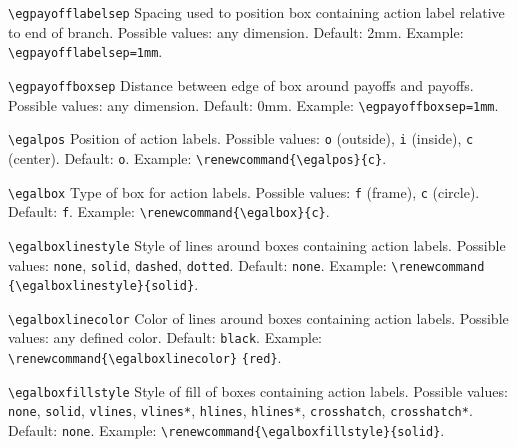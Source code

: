 \documentclass[12pt]{article}
\begin{document}
\vspace{4mm}

\sloppy
\noindent\verb+\egpayofflabelsep+\newline
\noindent Spacing used to position box containing action label relative to end
of branch.  Possible values: any dimension.  Default: 2mm.  Example:
\verb+\egpayofflabelsep=1mm+.

\fussy
\vspace{4mm}

\noindent\verb+\egpayoffboxsep+\newline
\noindent Distance between edge of box around payoffs and payoffs.  Possible
values: any dimension.  Default: 0mm.  Example: \verb+\egpayoffboxsep=1mm+.

\vspace{4mm}

\noindent\verb+\egalpos+\newline
\noindent Position of action labels.  Possible values: \verb+o+ (outside),
\verb+i+ (inside), \verb+c+ (center).  Default: \verb+o+.  Example:
\verb+\renewcommand{\egalpos}{c}+.

\vspace{4mm}

\noindent\verb+\egalbox+\newline
\noindent Type of box for action labels.  Possible values: \verb+f+ (frame),
\verb+c+ (circle).  Default: \verb+f+.  Example:
\verb+\renewcommand{\egalbox}{c}+.

\vspace{4mm}

\sloppy
\noindent\verb+\egalboxlinestyle+\newline
\noindent Style of lines around boxes containing action labels.  Possible
values: \verb+none+, \verb+solid+, \verb+dashed+, \verb+dotted+.  Default:
\verb+none+.  Example: \verb+\renewcommand+ \verb+{\egalboxlinestyle}{solid}+.

\fussy
\vspace{4mm}

\noindent\verb+\egalboxlinecolor+\newline
\noindent Color of lines around boxes containing action labels.  Possible
values: any defined color.  Default: \verb+black+.  Example:
\verb+\renewcommand{\egalboxlinecolor}+ \verb+{red}+.

\vspace{4mm}

\noindent\verb+\egalboxfillstyle+\newline
\noindent Style of fill of boxes containing action labels.  Possible values:
\verb+none+, \verb+solid+, \verb+vlines+, \verb+vlines*+, \verb+hlines+,
\verb+hlines*+, \verb+crosshatch+, \verb+crosshatch*+.  Default: \verb+none+. 
Example: \verb+\renewcommand{\egalboxfillstyle}{solid}+.
\end{document}
